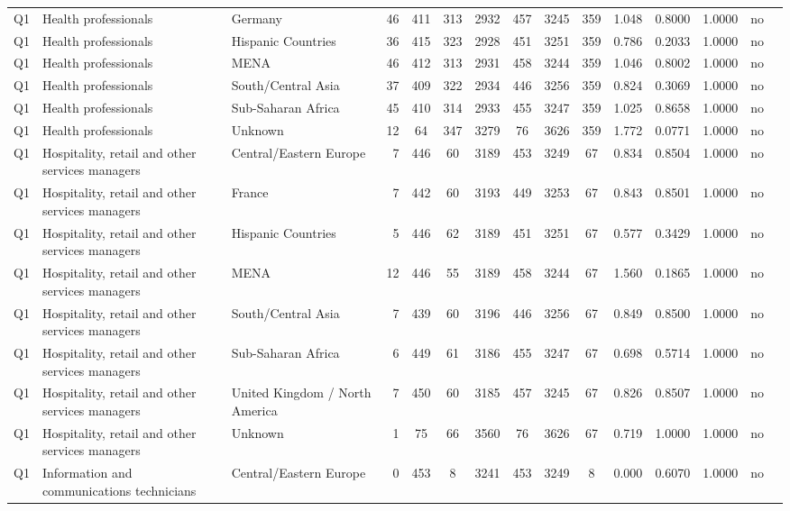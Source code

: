 \begin{longtable}{lllrcccccccccll}
Q1 & Health professionals & Germany & 46 & 411 & 313 & 2932 & 457 & 3245 & 359 & 1.048 & 0.8000 & 1.0000 & no \\
Q1 & Health professionals & Hispanic Countries & 36 & 415 & 323 & 2928 & 451 & 3251 & 359 & 0.786 & 0.2033 & 1.0000 & no \\
Q1 & Health professionals & MENA & 46 & 412 & 313 & 2931 & 458 & 3244 & 359 & 1.046 & 0.8002 & 1.0000 & no \\
Q1 & Health professionals & South/Central Asia & 37 & 409 & 322 & 2934 & 446 & 3256 & 359 & 0.824 & 0.3069 & 1.0000 & no \\
Q1 & Health professionals & Sub-Saharan Africa & 45 & 410 & 314 & 2933 & 455 & 3247 & 359 & 1.025 & 0.8658 & 1.0000 & no \\
Q1 & Health professionals & Unknown & 12 & 64 & 347 & 3279 & 76 & 3626 & 359 & 1.772 & 0.0771 & 1.0000 & no \\
Q1 & Hospitality, retail and other services managers & Central/Eastern Europe & 7 & 446 & 60 & 3189 & 453 & 3249 & 67 & 0.834 & 0.8504 & 1.0000 & no \\
Q1 & Hospitality, retail and other services managers & France & 7 & 442 & 60 & 3193 & 449 & 3253 & 67 & 0.843 & 0.8501 & 1.0000 & no \\
Q1 & Hospitality, retail and other services managers & Hispanic Countries & 5 & 446 & 62 & 3189 & 451 & 3251 & 67 & 0.577 & 0.3429 & 1.0000 & no \\
Q1 & Hospitality, retail and other services managers & MENA & 12 & 446 & 55 & 3189 & 458 & 3244 & 67 & 1.560 & 0.1865 & 1.0000 & no \\
Q1 & Hospitality, retail and other services managers & South/Central Asia & 7 & 439 & 60 & 3196 & 446 & 3256 & 67 & 0.849 & 0.8500 & 1.0000 & no \\
Q1 & Hospitality, retail and other services managers & Sub-Saharan Africa & 6 & 449 & 61 & 3186 & 455 & 3247 & 67 & 0.698 & 0.5714 & 1.0000 & no \\
Q1 & Hospitality, retail and other services managers & United Kingdom / North America & 7 & 450 & 60 & 3185 & 457 & 3245 & 67 & 0.826 & 0.8507 & 1.0000 & no \\
Q1 & Hospitality, retail and other services managers & Unknown & 1 & 75 & 66 & 3560 & 76 & 3626 & 67 & 0.719 & 1.0000 & 1.0000 & no \\
Q1 & Information and communications technicians & Central/Eastern Europe & 0 & 453 & 8 & 3241 & 453 & 3249 & 8 & 0.000 & 0.6070 & 1.0000 & no \\

\end{longtable}
